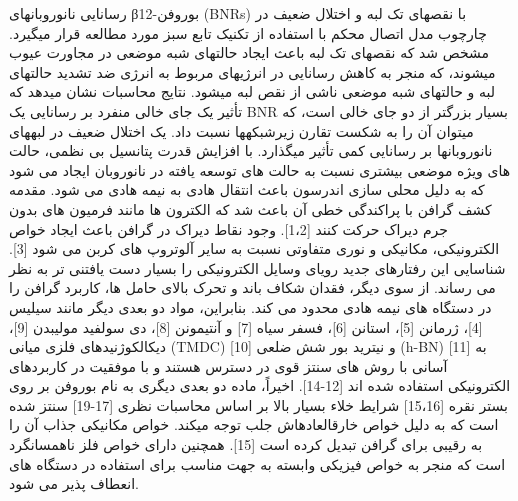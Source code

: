

% 
رسانایی نانوروبانهای β12-بوروفن (BNRs) با نقصهای تک لبه و اختلال ضعیف در چارچوب مدل اتصال محکم با استفاده از تکنیک تابع سبز مورد مطالعه قرار میگیرد. مشخص شد که نقصهای تک لبه باعث ایجاد حالتهای شبه موضعی در مجاورت عیوب میشوند، که منجر به کاهش رسانایی در انرژیهای مربوط به انرژی ضد تشدید حالتهای لبه و حالتهای شبه موضعی ناشی از نقص لبه میشود. نتایج محاسبات نشان میدهد که تأثیر یک جای خالی منفرد بر رسانایی یک BNR بسیار بزرگتر از دو جای خالی است، که میتوان آن را به شکست تقارن زیرشبکهها نسبت داد. یک اختلال ضعیف در لبههای نانوروبانها بر رسانایی کمی تأثیر میگذارد. با افزایش قدرت پتانسیل بی نظمی، حالت های ویژه موضعی بیشتری نسبت به حالت های توسعه یافته در نانوروبان ایجاد می شود که به دلیل محلی سازی اندرسون باعث انتقال هادی به نیمه هادی می شود.
مقدمه کشف گرافن با پراکندگی خطی آن باعث شد که الکترون ها مانند فرمیون های بدون جرم دیراک حرکت کنند [1،2]. وجود نقاط دیراک در گرافن باعث ایجاد خواص الکترونیکی، مکانیکی و نوری متفاوتی نسبت به سایر آلوتروپ های کربن می شود [3]. شناسایی این رفتارهای جدید رویای وسایل الکترونیکی را بسیار دست یافتنی تر به نظر می رساند. از سوی دیگر، فقدان شکاف باند و تحرک بالای حامل ها، کاربرد گرافن را در دستگاه های نیمه هادی محدود می کند. بنابراین، مواد دو بعدی دیگر مانند سیلیس [4]، ژرمانن [5]، استانن [6]، فسفر سیاه [7] و آنتیمونن [8]، دی سولفید مولیبدن [9]، دیکالکوژنیدهای فلزی میانی (TMDC) [10] و نیترید بور شش ضلعی (h-BN) [11] به آسانی با روش های سنتز قوی در دسترس هستند و با موفقیت در کاربردهای الکترونیکی استفاده شده اند [12-14]. اخیراً، ماده دو بعدی دیگری به نام بوروفن بر روی بستر نقره [15،16] شرایط خلاء بسیار بالا بر اساس محاسبات نظری [17-19] سنتز شده است که به دلیل خواص خارقالعادهاش جلب توجه میکند. خواص مکانیکی جذاب آن را به رقیبی برای گرافن تبدیل کرده است [15]. همچنین دارای خواص فلز ناهمسانگرد است که منجر به خواص فیزیکی وابسته به جهت مناسب برای استفاده در دستگاه های انعطاف پذیر می شود.
